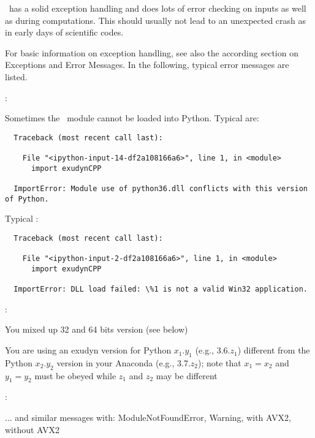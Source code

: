 \codeName\ has a solid exception handling and does lots of error checking on
inputs as well as during computations. This should usually not lead to an
unexpected crash as in early days of scientific codes.

For basic information on exception handling, see also the according section on
Exceptions and Error Messages. In the following, typical error messages are listed. 

\noindent {}:
\bi
  \item Sometimes the \codeName\ module cannot be loaded into Python. Typical  are: \vspace{1pt}\\
\plainlststyle
\begin{lstlisting}
  Traceback (most recent call last):

    File "<ipython-input-14-df2a108166a6>", line 1, in <module>
      import exudynCPP

  ImportError: Module use of python36.dll conflicts with this version of Python.
\end{lstlisting}
%
Typical :\vspace{1pt}\\
\begin{lstlisting}
  Traceback (most recent call last):
  
    File "<ipython-input-2-df2a108166a6>", line 1, in <module>
      import exudynCPP

  ImportError: DLL load failed: \%1 is not a valid Win32 application.
\end{lstlisting}
%
:
\bi
\item[$\ra$] You mixed up 32 and 64 bits version (see below) 
\item[$\ra$] You are using an exudyn version for Python $x_1.y_1$ (e.g., 3.6.$z_1$) different from the Python $x_2.y_2$ version in your Anaconda (e.g., 3.7.$z_2$); note that $x_1=x_2$ and $y_1=y_2$ must be obeyed while $z_1$ and $z_2$ may be different
\ei
%
\item {}:
\bi
\item[$\ra$] ... and similar messages with: ModuleNotFoundError, Warning, with AVX2, without AVX2
